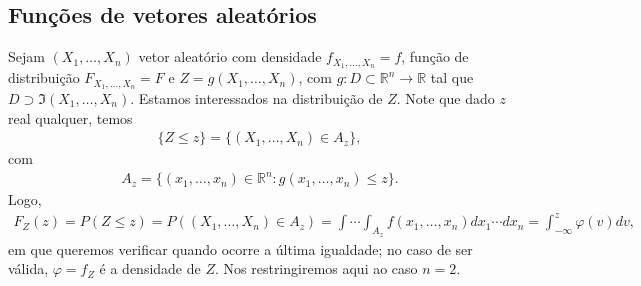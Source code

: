 \documentclass[../Notas.tex]{subfiles}
\begin{document}
\subsection{Funções de vetores aleatórios}
Sejam $(X_1, \dots, X_n)$ vetor aleatório com densidade $f_{X_1, \dots, X_n} = f$, função de distribuição $F_{X_1, \dots, X_n} = F$ e $Z = g(X_1, \dots, X_n)$, com $g:D\subset\mathbb{R}^n\to\mathbb{R}$ tal que $D\supset \Im(X_1, \dots, X_n)$. Estamos interessados na distribuição de $Z$. Note que dado $z$ real qualquer, temos
\begin{align*}
    \{Z\leq z\} = \{ (X_1, \dots, X_n)\in A_z \},
\end{align*}
com
\begin{align*}
    A_z = \{ (x_1, \dots, x_n)\in\mathbb{R}^n : g(x_1, \dots, x_n)\leq z \}.
\end{align*}
Logo,
\begin{align*}
    F_Z(z) = P(Z\leq z) = P((X_1, \dots, X_n)\in A_z) = \int\cdots\int_{A_z} f(x_1, \dots, x_n) dx_1\cdots dx_n = \int_{-\infty}^z \varphi(v)dv,
\end{align*}
em que queremos verificar quando ocorre a última igualdade; no caso de ser válida, $\varphi = f_Z$ é a densidade de $Z$. Nos restringiremos aqui ao caso $n=2$.
\end{document}
